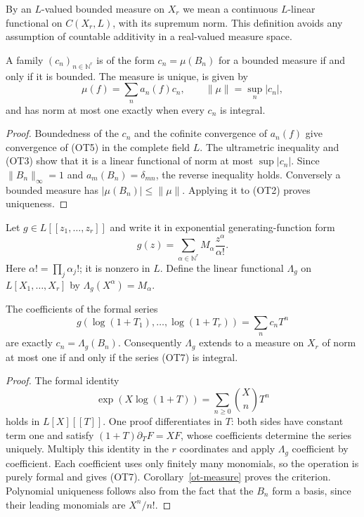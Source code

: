 By an $L$-valued bounded measure on $X_r$ we mean a continuous
$L$-linear functional on $C(X_r,L)$, with its supremum norm.  This
definition avoids any assumption of countable additivity in a
real-valued measure space.

\begin{corollary}\label{ot-measure}
A family $(c_n)_{n\in\mathbb N^r}$ is of the form
$c_n=\mu(B_n)$ for a bounded measure if and only if it is bounded.
The measure is unique, is given by
\[
             \mu(f)=\sum_n a_n(f)c_n,
             \qquad \|\mu\|=\sup_n|c_n|,
 \tag{OT5}
\]
and has norm at most one exactly when every $c_n$ is integral.
\end{corollary}
\begin{proof}
Boundedness of the $c_n$ and the cofinite convergence of $a_n(f)$
give convergence of (OT5) in the complete field $L$.  The
ultrametric inequality and (OT3) show that it is a linear
functional of norm at most $\sup|c_n|$.  Since
$\|B_n\|_\infty=1$ and $a_m(B_n)=\delta_{mn}$, the reverse
inequality holds.  Conversely a bounded measure has
$|\mu(B_n)|\le\|\mu\|$.  Applying it to (OT2) proves
uniqueness.
\end{proof}

Let $g\in L[[z_1,\ldots,z_r]]$ and write it in exponential
generating-function form
\[
 g(z)=\sum_{\alpha\in\mathbb N^r}
           M_\alpha\frac{z^\alpha}{\alpha!}.
 \tag{OT6}
\]
Here $\alpha!=\prod_j\alpha_j!$; it is nonzero in $L$.
Define the linear functional $\Lambda_g$ on $L[X_1,\ldots,X_r]$
by $\Lambda_g(X^\alpha)=M_\alpha$.

\begin{proposition}\label{ot-logarithm}
The coefficients of the formal series
\[
       g(\log(1+T_1),\ldots,\log(1+T_r))
       =\sum_n c_nT^n
 \tag{OT7}
\]
are exactly $c_n=\Lambda_g(B_n)$.  Consequently $\Lambda_g$
extends to a measure on $X_r$ of norm at most one if and only if
the series (OT7) is integral.
\end{proposition}
\begin{proof}
The formal identity
\[
 \exp(X\log(1+T))=\sum_{n\ge0}\binom Xn T^n
 \tag{OT8}
\]
holds in $L[X][[T]]$.  One proof differentiates in $T$: both sides
have constant term one and satisfy
$(1+T)\partial_T F=XF$, whose coefficients determine the series
uniquely.  Multiply this identity in the $r$ coordinates and apply
$\Lambda_g$ coefficient by coefficient.  Each coefficient uses
only finitely many monomials, so the operation is purely formal
and gives (OT7).  Corollary~\ref{ot-measure} proves the criterion.
Polynomial uniqueness follows also from the fact that the $B_n$
form a basis, since their leading monomials are $X^n/n!$.
\end{proof}

